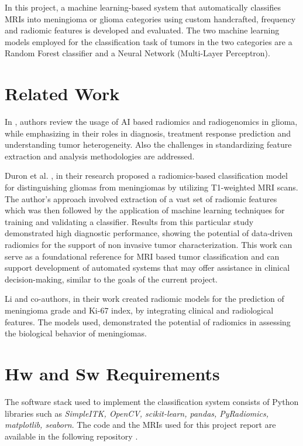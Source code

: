 \documentclass[11pt,a4paper]{article}
\begin{document}
In this project, a machine learning-based system that automatically 
classifies MRIs into meningioma or glioma categories 
using custom handcrafted, frequency and radiomic features 
is developed and evaluated.
The two machine learning models employed 
for the classification task of tumors in the two categories 
are a Random Forest classifier and 
a Neural Network (Multi-Layer Perceptron). 

\section{Related Work}

	In \cite{Fan}, authors review the usage of AI based radiomics and radiogenomics in glioma, 
	while emphasizing in their roles in diagnosis, treatment response prediction and understanding tumor heterogeneity. 
	Also the challenges in standardizing feature extraction and analysis methodologies are addressed.


	Duron et al. \cite{duron}, in their research
	proposed a radiomics-based classification model for distinguishing 
	gliomas from meningiomas by utilizing T1-weighted MRI scans. 
	The author's approach involved extraction of a vast set of radiomic features 
	which was then followed by the application of machine learning techniques for training and validating a classifier. 
	Results from this particular study demonstrated high diagnostic performance, 
	showing the potential of  data-driven radiomics for the support of
	non invasive tumor characterization. 
	This work can serve as a foundational reference for 
	MRI based tumor classification and 
	can support development of automated systems that may offer assistance
	in clinical decision-making, similar to the goals of the current project.
	
	Li and co-authors\cite{li}, in their work created radiomic models for the
	prediction of meningioma grade and Ki-67 index, 
	by integrating clinical and radiological features. 
	The models used, demonstrated the potential of radiomics in assessing 
	the biological behavior of meningiomas.

    \section{Hw and Sw Requirements}
	\par The software stack used to implement the classification system consists of Python libraries
	such as \textit{SimpleITK, OpenCV, scikit-learn, pandas, PyRadiomics, matplotlib, seaborn}.
	The code and the MRIs used for this project report are available in the following repository \cite{code}.
\end{document}
